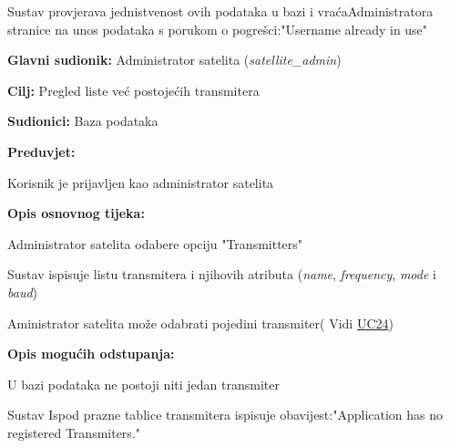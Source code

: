 \begin{packed_item}
\begin{packed_enum}
\begin{packed_enum}
						\item[2.1] Sustav provjerava jednistvenost ovih podataka u bazi i vraća\newline Administratora stranice na unos podataka s porukom o pogrešci:\newline "Username already in use"
					\end{packed_enum}
					\end{packed_enum}
				\end{packed_item}
			
			\noindent {}
			\begin{packed_item}
				
				\item \textbf{Glavni sudionik: }Administrator satelita (\textit{satellite\_admin})
				\item  \textbf{Cilj: }Pregled liste već postojećih transmitera
				\item  \textbf{Sudionici: }Baza podataka
				\item  \textbf{Preduvjet: }
				\begin{packed_enum}
					\item Korisnik je prijavljen kao administrator satelita	\end{packed_enum}
				\item  \textbf{Opis osnovnog tijeka: }
				
				\item[] \begin{packed_enum}
					
					\item Administrator satelita odabere opciju "Transmitters"
					\item Sustav ispisuje listu transmitera i njihovih atributa (\textit{name}, \textit{frequency}, \textit{mode} i \textit{baud})
					\item Aministrator satelita može odabrati pojedini transmiter( Vidi \hyperref[UC24] {UC24})
					
				\end{packed_enum}
				
				\item  \textbf{Opis mogućih odstupanja: }
				
				\item[] \begin{packed_enum}
					
					\item[1] U bazi podataka ne postoji niti jedan transmiter
					\item[ ] \begin{packed_enum}
						
						\item[1.1] Sustav Ispod prazne tablice transmitera ispisuje obavijest:\newline "Application has no registered Transmiters." 
					\end{packed_enum}
				\end{packed_enum}
			\end{packed_item}
